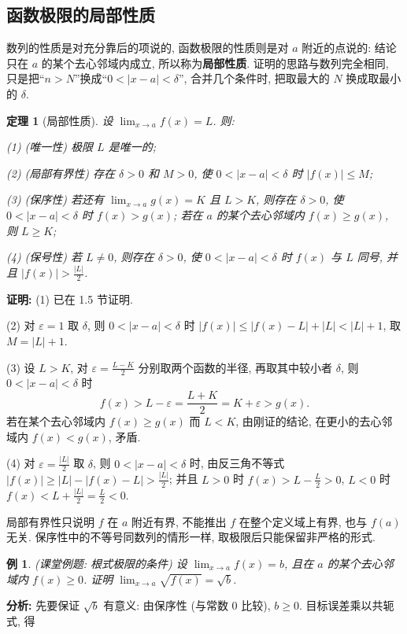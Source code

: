 \documentclass[UTF8,openany]{ctexbook}
\theoremstyle{chinesetextbook}
\newtheorem{example}{例}[section]
\newtheorem{theorem}{定理}[section]
\newenvironment{cnproof}{\par\indent\textbf{证明:} \ignorespaces}{\par}
\begin{document}
\subsection{函数极限的局部性质}
数列的性质是对充分靠后的项说的, 函数极限的性质则是对 $a$ 附近的点说的: 结论只在 $a$ 的某个去心邻域内成立, 所以称为\textbf{局部性质}. 证明的思路与数列完全相同, 只是把“$n>N$”换成“$0<|x-a|<\delta$”, 合并几个条件时, 把取最大的 $N$ 换成取最小的 $\delta$.
\begin{theorem}[局部性质]
设 $\displaystyle\lim_{x\to a}f(x)=L$. 则:

\textup{(1)} (唯一性) 极限 $L$ 是唯一的;

\textup{(2)} (局部有界性) 存在 $\delta>0$ 和 $M>0$, 使 $0<|x-a|<\delta$ 时 $|f(x)|\le M$;

\textup{(3)} (保序性) 若还有 $\displaystyle\lim_{x\to a}g(x)=K$ 且 $L>K$, 则存在 $\delta>0$, 使 $0<|x-a|<\delta$ 时 $f(x)>g(x)$; 若在 $a$ 的某个去心邻域内 $f(x)\ge g(x)$, 则 $L\ge K$;

\textup{(4)} (保号性) 若 $L\ne0$, 则存在 $\delta>0$, 使 $0<|x-a|<\delta$ 时 $f(x)$ 与 $L$ 同号, 并且 $\displaystyle|f(x)|>\frac{|L|}2$.
\end{theorem}
\begin{cnproof}
(1) 已在 1.5 节证明.

(2) 对 $\varepsilon=1$ 取 $\delta$, 则 $0<|x-a|<\delta$ 时 $|f(x)|\le|f(x)-L|+|L|<|L|+1$, 取 $M=|L|+1$.

(3) 设 $L>K$, 对 $\displaystyle\varepsilon=\frac{L-K}2$ 分别取两个函数的半径, 再取其中较小者 $\delta$, 则 $0<|x-a|<\delta$ 时
\[
f(x)>L-\varepsilon=\frac{L+K}2=K+\varepsilon>g(x).
\]
若在某个去心邻域内 $f(x)\ge g(x)$ 而 $L<K$, 由刚证的结论, 在更小的去心邻域内 $f(x)<g(x)$, 矛盾.

(4) 对 $\displaystyle\varepsilon=\frac{|L|}2$ 取 $\delta$, 则 $0<|x-a|<\delta$ 时, 由反三角不等式 $\displaystyle|f(x)|\ge|L|-|f(x)-L|>\frac{|L|}2$; 并且 $L>0$ 时 $\displaystyle f(x)>L-\frac L2>0$, $L<0$ 时 $\displaystyle f(x)<L+\frac{|L|}2=\frac L2<0$.
\end{cnproof}
局部有界性只说明 $f$ 在 $a$ 附近有界, 不能推出 $f$ 在整个定义域上有界, 也与 $f(a)$ 无关. 保序性中的不等号同数列的情形一样, 取极限后只能保留非严格的形式.
\begin{example}
\textnormal{(课堂例题: 根式极限的条件)} 设 $\displaystyle\lim_{x\to a}f(x)=b$, 且在 $a$ 的某个去心邻域内 $f(x)\ge0$. 证明 $\displaystyle\lim_{x\to a}\sqrt{f(x)}=\sqrt b$.
\end{example}
\par\indent\textbf{分析:} 先要保证 $\sqrt b$ 有意义: 由保序性 (与常数 $0$ 比较), $b\ge0$. 目标误差乘以共轭式, 得
\end{document}
